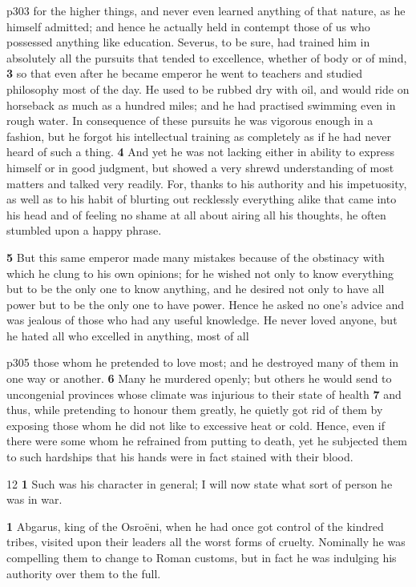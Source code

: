 p303 for the higher things, and never even learned anything of that nature, as he himself admitted; and hence he actually held in contempt those of us who possessed anything like education. Severus, to be sure, had trained him in absolutely all the pursuits that tended to excellence, whether of body or of mind, \textbf{3} so that even after he became emperor he went to teachers and studied philosophy most of the day. He used to be rubbed dry with oil, and would ride on horseback as much as a hundred miles; and he had practised swimming even in rough water. In consequence of these pursuits he was vigorous enough in a fashion, but he forgot his intellectual training as completely as if he had never heard of such a thing. \textbf{4} And yet he was not lacking either in ability to express himself or in good judgment, but showed a very shrewd understanding of most matters and talked very readily. For, thanks to his authority and his impetuosity, as well as to his habit of blurting out recklessly everything alike that came into his head and of feeling no shame at all about airing all his thoughts, he often stumbled upon a happy phrase.

\textbf{5} But this same emperor made many mistakes because of the obstinacy with which he clung to his own opinions; for he wished not only to know everything but to be the only one to know anything, and he desired not only to have all power but to be the only one to have power. Hence he asked no one's advice and was jealous of those who had any useful knowledge. He never loved anyone, but he hated all who excelled in anything, most of all

p305 those whom he pretended to love most; and he destroyed many of them in one way or another. \textbf{6} Many he murdered openly; but others he would send to uncongenial provinces whose climate was injurious to their state of health \textbf{7} and thus, while pretending to honour them greatly, he quietly got rid of them by exposing those whom he did not like to excessive heat or cold. Hence, even if there were some whom he refrained from putting to death, yet he subjected them to such hardships that his hands were in fact stained with their blood.

12
\textbf{1} Such was his character in general; I will now state what sort of person he was in war.

\textbf{1} Abgarus, king of the Osroëni, when he had once got control of the kindred tribes, visited upon their leaders all the worst forms of cruelty. Nominally he was compelling them to change to Roman customs, but in fact he was indulging his authority over them to the full.


